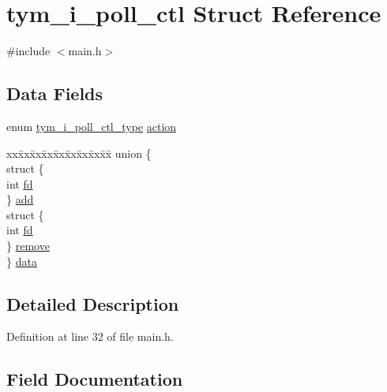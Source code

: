 \hypertarget{structtym__i__poll__ctl}{}\section{tym\+\_\+i\+\_\+poll\+\_\+ctl Struct Reference}
\label{structtym__i__poll__ctl}


{\ttfamily \#include $<$main.\+h$>$}

\subsection*{Data Fields}
\begin{DoxyCompactItemize}
\item 
enum \hyperlink{main_8h_a1666a0160e6b99e74467ae6da7abb7b2}{tym\+\_\+i\+\_\+poll\+\_\+ctl\+\_\+type} \hyperlink{structtym__i__poll__ctl_a3d85401c2ac04c2a50514ea0bc8d36b8}{action}
\item 
\begin{tabbing}
xx\=xx\=xx\=xx\=xx\=xx\=xx\=xx\=xx\=\kill
union \{\\
\>struct \{\\
\>\>int \hyperlink{structtym__i__poll__ctl_adc46934793b19781d13a968f0e02bc61}{fd}\\
\>\} \hyperlink{structtym__i__poll__ctl_ae09579b3379e1bb567b93315ab2d1b17}{add}\\
\>struct \{\\
\>\>int \hyperlink{structtym__i__poll__ctl_adc46934793b19781d13a968f0e02bc61}{fd}\\
\>\} \hyperlink{structtym__i__poll__ctl_a80c40d3adb3e7fcbb0b9a7616b68abd7}{remove}\\
\} \hyperlink{structtym__i__poll__ctl_a4f0e14929df76e484fd7542617d8b32a}{data}\\

\end{tabbing}\end{DoxyCompactItemize}


\subsection{Detailed Description}


Definition at line 32 of file main.\+h.



\subsection{Field Documentation}
\mbox{\label{structtym__i__poll__ctl_a3d85401c2ac04c2a50514ea0bc8d36b8}} 
